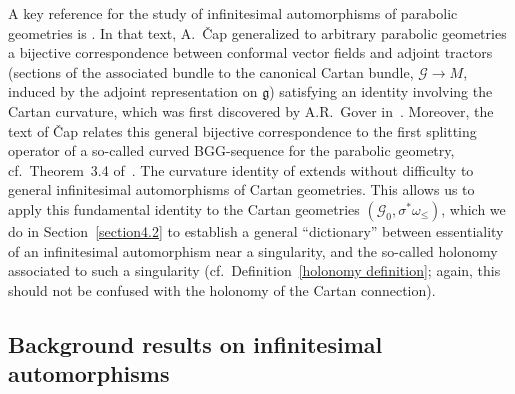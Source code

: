 \documentclass[pdftex]{sigma}
\def\g{\mathfrak{g}}
\def\Gbdle{\mathcal{G}}
\theoremstyle{plain}
\theoremstyle{definition}
\begin{document}
A key reference for the study of inf\/initesimal automorphisms of parabolic geometries is \cite{Cap inf aut}. In that text, A.~\v{C}ap generalized to arbitrary parabolic geometries a bijective correspondence between conformal vector f\/ields and adjoint tractors (sections of the associated bundle to the canonical Cartan bundle, $\Gbdle \rightarrow M$, induced by the adjoint representation on $\g$) satisfying an identity involving the Cartan curvature, which was f\/irst discovered by A.R.~Gover in~\cite{Gover}. Moreover, the text of \v{C}ap relates this general bijective correspondence to the f\/irst splitting operator of a so-called curved BGG-sequence for the parabolic geometry, cf.\ Theorem~3.4 of~\cite{Cap inf aut}. The curvature identity of \cite{Cap inf aut} extends without dif\/f\/iculty to general inf\/initesimal automorphisms of Cartan geometries. This allows us to apply this fundamental identity to the Cartan geometries $(\Gbdle_0,\sigma^*\omega_{\leq})$, which we do in Section~\ref{section4.2} to establish a general ``dictionary'' between essentiality of an inf\/initesimal automorphism near a singularity, and the so-called holonomy associated to such a singularity (cf.\ Def\/inition~\ref{holonomy definition}; again, this should not be confused with the holonomy of the Cartan connection).

\subsection{Background results on inf\/initesimal automorphisms}\label{section4.1}
\end{document}
